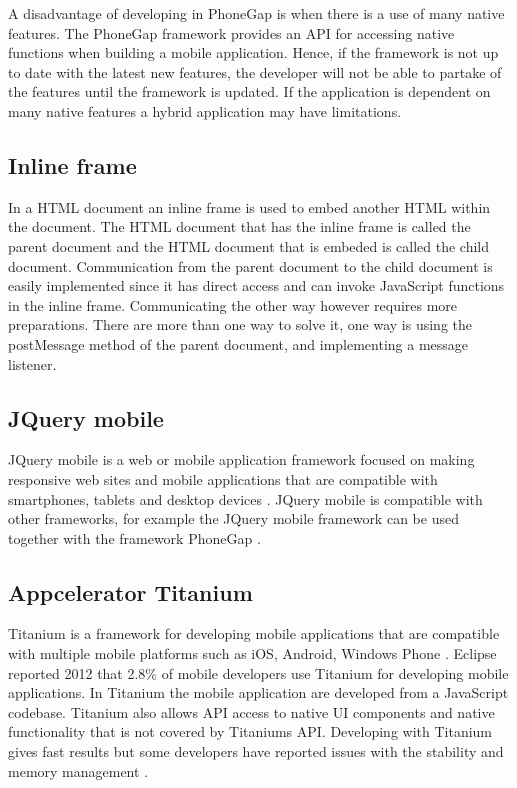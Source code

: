 A disadvantage of developing in PhoneGap is when there is a use of many native features. The PhoneGap framework provides an API for accessing native functions when building a mobile application. Hence, if the framework is not up to date with the latest new features, the developer will not be able to partake of the features until the framework is updated. If the application is dependent on many native features a hybrid application may have limitations\cite{kohan2015}.

\subsection{Inline frame}\label{subsec:inline-frame}
In a HTML document an inline frame is used to embed another HTML within the document. The HTML document that has the inline frame is called the parent document and the HTML document that is embeded is called the child document. Communication from the parent document to the child document is easily implemented since it has direct access and can invoke JavaScript functions in the inline frame. Communicating the other way however requires more preparations. There are more than one way to solve it, one way is using the postMessage method of the parent document, and implementing a message listener.

\subsection{JQuery mobile}\label{subsec:jquery-mobile}
JQuery mobile is a web or mobile application framework focused on making responsive web sites and mobile applications that are compatible with smartphones, tablets and desktop devices \cite{jquery-mobile15}. JQuery mobile is compatible with other frameworks, for example the JQuery mobile framework can be used together with the framework PhoneGap \cite{tech-republic-jquery-mobile-compatible14}. 

\subsection{Appcelerator Titanium}\label{subsec:appcelerator-titanium}
Titanium is a framework for developing mobile applications that are compatible with multiple mobile platforms such as iOS, Android, Windows Phone \cite{titanium15}. Eclipse reported 2012 that 2.8\% of mobile developers use Titanium for developing mobile applications. In Titanium the mobile application are developed from a JavaScript codebase. Titanium also allows API access to native UI components and native functionality that is not covered by Titaniums API. Developing with Titanium gives fast results but some developers have reported issues with the stability and memory management \cite{stay-away1-titanium15} \cite{stay-away2-titanium15}. 


